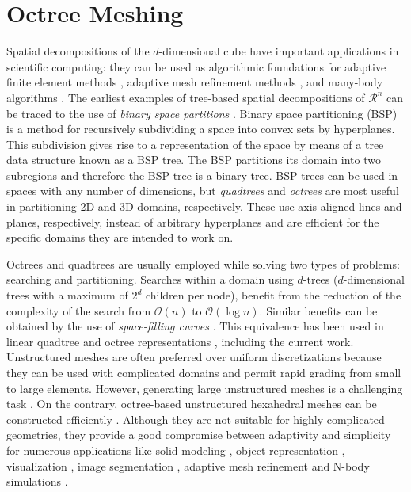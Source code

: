 


\chapter{Octree Meshing}
\label{chap:octree}

Spatial decompositions of the $d$-dimensional cube have important
applications in scientific computing: they can be used as algorithmic
foundations for adaptive finite element methods \cite{becker00,kim02},
adaptive mesh refinement methods \cite{griebel98, popinet03}, and
many-body algorithms \cite{greengard89, aluru02, shangHua98, warren92,
ying04, ying03}. The earliest examples of tree-based spatial
decompositions of $\mathcal{R}^n$ can be traced to the use of {\em
binary space partitions} \cite{ fuchs83, fuchs80, schumaker69}.
Binary space partitioning (BSP) is a method for recursively
subdividing a space into convex sets by hyperplanes. This subdivision
gives rise to a representation of the space by means of a tree data
structure known as a BSP tree. The BSP partitions its domain into two
subregions and therefore the BSP tree is a binary tree. BSP trees can
be used in spaces with any number of dimensions, but {\em quadtrees}
\cite{finkel74} and {\em octrees} \cite{meagher82} are most useful in
partitioning 2D and 3D domains, respectively. These use axis aligned
lines and planes, respectively, instead of arbitrary hyperplanes and
are efficient for the specific domains they are intended to work on.

Octrees and quadtrees are usually employed while solving two types of
problems: searching and partitioning. Searches within a domain using
$d$-trees ($d$-dimensional trees with a maximum of $2^d$ children per
node), benefit from the reduction of the complexity of the search from
$\mathcal{O}(n)$ to $\mathcal{O}(\log n)$. Similar benefits can be
obtained by the use of {\em space-filling curves} \cite{tropf81}. This
equivalence has been used in linear quadtree and octree
representations \cite{bern99, tu05}, including the current
work. Unstructured meshes are often preferred over uniform
discretizations because they can be used with complicated domains and
permit rapid grading from small to large elements. However, generating
large unstructured meshes is a challenging task \cite{shewchuk98}. On
the contrary, octree-based unstructured hexahedral meshes can be
constructed efficiently \cite{berti04, greaves99, schneiders97,
schneiders96,shepard91, tu04b}. Although they are not suitable for
highly complicated geometries, they provide a good compromise between
adaptivity and simplicity for numerous applications like solid
modeling \cite{meagher82}, object representation \cite{ayala85,
brunet90}, visualization \cite{freitag99}, image segmentation
\cite{strasters91}, adaptive mesh refinement \cite{griebel98,
popinet03} and N-body simulations \cite{greengard89, aluru02,
shangHua98, warren92, ying04, ying03}.

